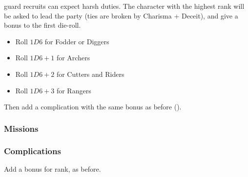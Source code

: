 \begin{multicols}{2}

\noindent
\Gls{guard} recruits can expect harsh duties.
The character with the highest rank will be asked to lead the party (ties are broken by Charisma + Deceit), and give a bonus to the first die-roll.

\begin{itemize}
  \item
  Roll $1D6$ for Fodder or Diggers
  \item
  Roll $1D6+1$ for Archers
  \item
  Roll $1D6+2$ for Cutters and Riders
  \item
  Roll $1D6+3$ for Rangers
\end{itemize}

Then add a complication with the same bonus as before ().

\subsubsection{Missions}

\ngMissions

\subsubsection{Complications}
\label{missionComplications}

Add a bonus for rank, as before.

\missionComplications

\end{multicols}
